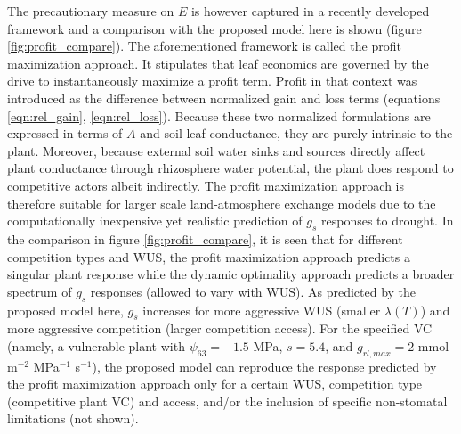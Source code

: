 \documentclass[utf8]{frontiersSCNS} %
\begin{document}
The precautionary measure on $E$ is however captured in a recently developed framework \citep{sperry_pragmatic_2016, sperry_predicting_2017} and a comparison with the proposed model here is shown (figure \ref{fig:profit_compare}). The aforementioned framework is called the profit maximization approach. It stipulates that leaf economics are governed by the drive to instantaneously maximize a profit term. Profit in that context was introduced as the difference between normalized gain and loss terms (equations \ref{eqn:rel_gain}, \ref{eqn:rel_loss}). Because these two normalized formulations are expressed in terms of $A$ and soil-leaf conductance, they are purely intrinsic to the plant. Moreover, because external soil water sinks and sources directly affect plant conductance through rhizosphere water potential, the plant does respond to competitive actors albeit indirectly. The profit maximization approach is therefore suitable for larger scale land-atmosphere exchange models due to the computationally inexpensive yet realistic prediction of $g_s$ responses to drought. In the comparison in figure \ref{fig:profit_compare}, it is seen that for different competition types and WUS, the profit maximization approach predicts a singular plant response while the dynamic optimality approach predicts a broader spectrum of $g_s$ responses (allowed to vary with WUS). As predicted by the proposed model here, $g_s$ increases for more aggressive WUS (smaller $\lambda(T)$) and more aggressive competition (larger competition access). For the specified VC (namely, a vulnerable plant with $\psi_{63} = -1.5$ MPa, $s=5.4$, and $g_{rl,max} = 2$ mmol m$^{-2}$ MPa$^{-1}$ s$^{-1}$), the proposed model can reproduce the response predicted by the profit maximization approach only for a certain WUS, competition type (competitive plant VC) and access, and/or the inclusion of specific non-stomatal limitations (not shown).

\end{document}
